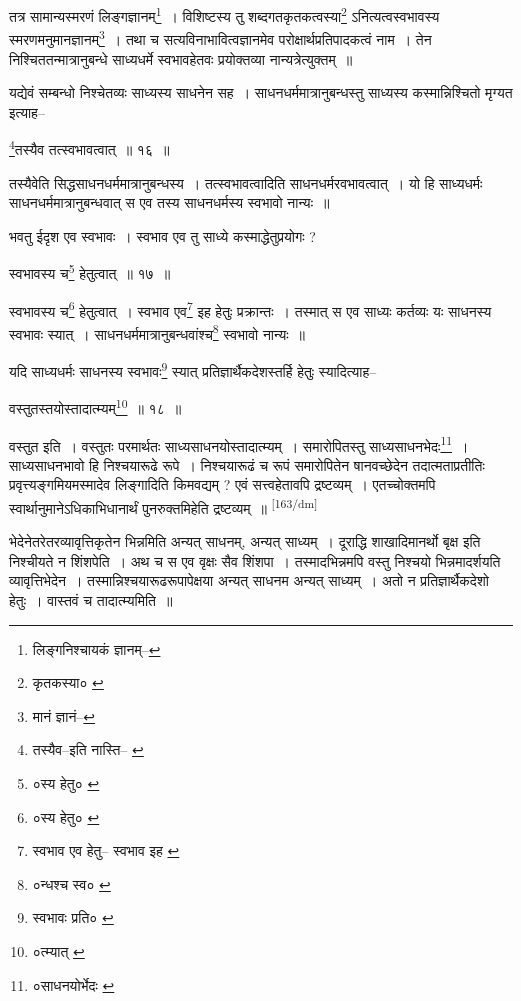 \documentclass[article,12pt,a4paper]{memoir}
\begin{document}
	तत्र सामान्यस्मरणं लिङ्गज्ञानम्\footnote{लिङ्गनिश्चायकं ज्ञानम्--\cite{dp-msD-n}} । विशिष्टस्य तु शब्दगतकृतकत्वस्या\footnote{कृतकस्या० \cite{dp-edH}} ऽनित्यत्वस्वभावस्य स्मरणमनुमानज्ञानम्\footnote{मानं ज्ञानं--\cite{dp-msC}} । तथा च सत्यविनाभावित्वज्ञानमेव परोक्षार्थप्रतिपादकत्वं नाम । तेन निश्चिततन्मात्रानुबन्धे साध्यधर्मे स्वभावहेतवः प्रयोक्तव्या नान्यत्रेत्युक्तम् ॥ 
	  
	यद्येवं सम्बन्धो निश्चेतव्यः साध्यस्य साधनेन सह । साधनधर्ममात्रानुबन्धस्तु साध्यस्य कस्मान्निश्चितो मृग्यत इत्याह-- 
	  
	\footnote{तस्यैव--इति नास्ति--\cite{dp-edP} \cite{dp-edH}}तस्यैव तत्स्वभावत्वात् ॥ १६ ॥ 
	  
	तस्यैवेति सिद्धसाधनधर्ममात्रानुबन्धस्य । तत्स्वभावत्वादिति साधनधर्मरवभावत्वात् । यो हि साध्यधर्मः साधनधर्ममात्रानुबन्धवात् स एव तस्य साधनधर्मस्य स्वभावो नान्यः ॥ 
	  
	भवतु ईदृश एव स्वभावः । स्वभाव एव तु साध्ये कस्माद्धेतुप्रयोगः ? 
	  
	स्वभावस्य च\footnote{०स्य हेतु० \cite{dp-msC}} हेतुत्वात् ॥ १७ ॥ 
	  
	स्वभावस्य च\footnote{०स्य हेतु० \cite{dp-msC}} हेतुत्वात् । स्वभाव एव\footnote{स्वभाव एव हेतु--\cite{dp-msB} स्वभाव इह \cite{dp-msA} \cite{dp-edP} \cite{dp-edH} \cite{dp-edN}} इह हेतुः प्रक्रान्तः । तस्मात् स एव साध्यः कर्तव्यः यः साधनस्य स्वभावः स्यात् । साधनधर्ममात्रानुबन्धवांश्च\footnote{०न्धश्च स्व० \cite{dp-msA} \cite{dp-edP} \cite{dp-edE} \cite{dp-edH} \cite{dp-edN}} स्वभावो नान्यः ॥ 
	  
	यदि साध्यधर्मः साधनस्य स्वभावः\footnote{स्वभावः प्रति० \cite{dp-msA} \cite{dp-msB} \cite{dp-msD} \cite{dp-edP} \cite{dp-edE} \cite{dp-edH} \cite{dp-edN}} स्यात् प्रतिज्ञार्थैकदेशस्तर्हि हेतुः स्यादित्याह-- 
	  
	वस्तुतस्तयोस्तादात्म्यम्\footnote{०त्म्यात् \cite{dp-msB} \cite{dp-msD} \cite{dp-edP} \cite{dp-edH} \cite{dp-edE} \cite{dp-edN}} ॥ १८ ॥ 
	  
	वस्तुत इति । वस्तुतः परमार्थतः साध्यसाधनयोस्तादात्म्यम् । समारोपितस्तु साध्यसाधनभेदः\footnote{०साधनयोर्भेदः \cite{dp-msA} \cite{dp-edP} \cite{dp-edH} \cite{dp-edE} \cite{dp-edN}} । साध्यसाधनभावो हि निश्चयारूढे रूपे । निश्चयारूढं च रूपं समारोपितेन षानवच्छेदेन तदात्मताप्रतीतिः प्रवृत्त्यङ्गमियमस्मादेव लिङ्गादिति किमवद्यम् ? एवं सत्त्वहेतावपि द्रष्टव्यम् । एतच्चोक्तमपि स्वार्थानुमानेऽधिकाभिधानार्थं पुनरुक्तमिहेति द्रष्टव्यम् ॥
	\pend
      \leavevmode\textsuperscript{\rmlatinfont\tiny [163/dm]}

	  \pstart भेदेनेतरेतरव्यावृत्तिकृतेन भिन्नमिति अन्यत् साधनम्, अन्यत् साध्यम् । दूराद्धि शाखादिमानर्थो बृक्ष इति निश्चीयते न शिंशपेति । अथ च स एव वृक्षः सैव शिंशपा । तस्मादभिन्नमपि वस्तु निश्चयो भिन्नमादर्शयति व्यावृत्तिभेदेन । तस्मान्निश्चयारूढरूपापेक्षया अन्यत् साधनम अन्यत् साध्यम् । अतो न प्रतिज्ञार्थैकदेशो हेतुः । वास्तवं च तादात्म्यमिति ॥
	\pend
       
\end{document}
